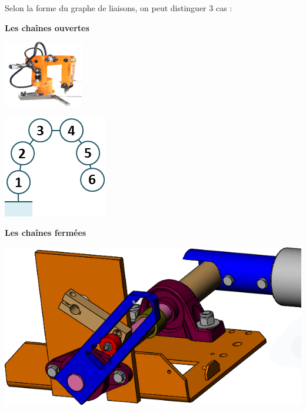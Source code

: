 \documentclass[10pt,fleqn]{article} %
\begin{document}
\begin{defi}
Selon la forme du graphe de liaisons, on peut distinguer 3 cas :
\begin{multicols}{3}
\begin{center}
\textbf{Les chaînes ouvertes} 
\end{center}

\begin{center}
\includegraphics[width=.6\linewidth]{images/ericc_01}

\vspace{.5cm}

\includegraphics[width=.6\linewidth]{images/ericc_02}
\end{center}

\begin{center}
\textbf{Les chaînes fermées} 
\end{center}

\begin{center}
\includegraphics[width=.8\linewidth]{images/sympact_01}


\end{center}
\end{multicols}
\end{defi}
\end{document}
